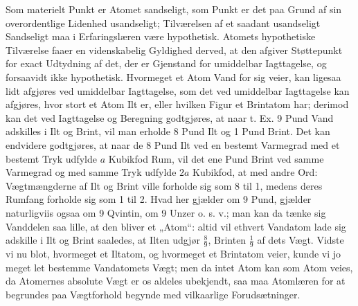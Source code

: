 \documentclass[12pt,a4paper]{book}
\begin{document}
Som materielt Punkt er Atomet sandseligt, som Punkt
er det paa Grund af sin overordentlige Lidenhed usandseligt;
Tilværelsen af et saadant usandseligt Sandseligt maa i Erfaringslæren
være hypothetisk. Atomets hypothetiske Tilværelse
faaer en videnskabelig Gyldighed derved, at den afgiver Støttepunkt
for exact Udtydning af det, der er Gjenstand for
umiddelbar Iagttagelse, og forsaavidt ikke hypothetisk. Hvormeget
et Atom Vand for sig veier, kan ligesaa lidt afgjøres
ved umiddelbar Iagttagelse, som det ved umiddelbar Iagttagelse
kan afgjøres, hvor stort et Atom Ilt er, eller hvilken
Figur et Brintatom har; derimod kan det ved Iagttagelse og
Beregning godtgjøres, at naar t. Ex. 9 Pund Vand adskilles
i Ilt og Brint, vil man erholde 8 Pund Ilt og 1 Pund
Brint. Det kan endvidere godtgjøres, at naar de 8 Pund
Ilt ved en bestemt Varmegrad med et bestemt Tryk udfylde
$a$ Kubikfod Rum, vil det ene Pund Brint ved samme Varmegrad
og med samme Tryk udfylde $2a$ Kubikfod, at med andre
Ord: Vægtmængderne af Ilt og Brint ville forholde sig som
8 til 1, medens deres Rumfang forholde sig som 1 til 2.
Hvad her gjælder om 9 Pund, gjælder naturligviis ogsaa
om 9 Qvintin, om 9 Unzer o. s. v.; man kan da tænke sig
Vanddelen saa lille, at den bliver et „Atom“: altid vil ethvert
Vandatom lade sig adskille i Ilt og Brint saaledes, at Ilten
udgjør $\frac{8}{9}$, Brinten $\frac{1}{9}$ af dets Vægt. Vidste vi nu blot,
hvormeget et Iltatom, og hvormeget et Brintatom veier, kunde
vi jo meget let bestemme Vandatomets Vægt; men da intet
Atom kan som Atom veies, da Atomernes absolute Vægt er
os aldeles ubekjendt, saa maa Atomlæren for at begrundes
paa Vægtforhold begynde med vilkaarlige Forudsætninger.
\end{document}
